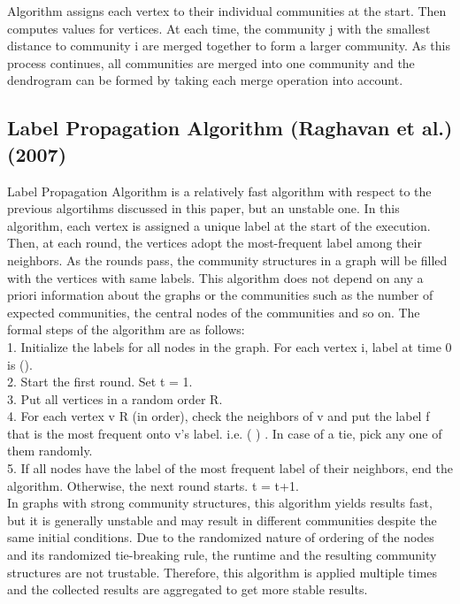 \documentclass[10pt]{article}
\begin{document}
Algorithm assigns each vertex to their individual communities at the start. Then computes values for vertices. At each time, the community j with the smallest distance to community i are
merged together to form a larger community. As this process continues, all communities are merged into one community and the dendrogram can be formed by taking each merge operation into account. \\

\subsection{Label Propagation Algorithm (Raghavan et al.) (2007)}

Label Propagation Algorithm is a relatively fast algorithm with respect to the previous algortihms discussed in this paper, but an unstable one. In this algorithm, each vertex is assigned a unique label at the start of the execution. Then, at each round, the vertices adopt the most-frequent label among their neighbors. As the rounds pass, the community structures in a graph will be filled with the vertices with same labels\cite{raghavan}. This algorithm does not depend on any a priori information about the graphs or the communities such as the number of expected communities, the central nodes of the communities and so on. The formal steps of the algorithm are as follows: \\

1. Initialize the labels for all nodes in the graph. For each vertex i, label at time 0 is (). \\
2. Start the first round. Set t = 1. \\
3. Put all vertices in a random order R. \\
4. For each vertex v R (in order), check the neighbors of v and put the label f that is the most frequent onto v’s label. i.e. ( ) . In case of a tie, pick any one of them
randomly. \\
5. If all nodes have the label of the most frequent label of their neighbors, end the algorithm. Otherwise, the next round starts. t = t+1. \\

In graphs with strong community structures, this algorithm yields results fast\cite{raghavan}, but it is generally unstable and may result in different communities despite the same initial conditions. Due
to the randomized nature of ordering of the nodes and its randomized tie-breaking rule, the runtime and the resulting community structures are not trustable. Therefore, this algorithm is applied multiple times and the collected results are aggregated to get more stable results. \\
\end{document}
